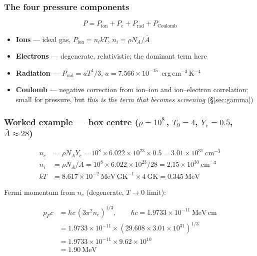\subsubsection{The four pressure components}
\label{sec:pressurecomponents}

\begin{equation*}
P = P_{\mathrm{ion}} + P_{e} + P_{\mathrm{rad}} + P_{\mathrm{Coulomb}}
\end{equation*}

\begin{itemize}
\item \textbf{Ions} --- ideal gas, $P_{\mathrm{ion}} = n_i kT$,
      $n_i = \rho N_A/\bar{A}$
\item \textbf{Electrons} --- degenerate, relativistic; the dominant term here
\item \textbf{Radiation} --- $P_{\mathrm{rad}} = aT^4/3$,
      $a = 7.566\times10^{-15}$~erg\,cm$^{-3}$\,K$^{-4}$
      \citep{codata2022}
\item \textbf{Coulomb} --- negative correction from ion--ion and ion--electron
      correlation; small for pressure, but \emph{this is the term that becomes
      screening} (\S\ref{sec:gamma})
\end{itemize}

\subsubsection{Worked example --- box centre
  (\texorpdfstring{$\rho = 10^{8}$\,\gcc, $T_9 = 4$, $Y_e = 0.5$,
   $\bar{A} \approx 28$}{rho = 1e8, T9 = 4, Ye = 0.5, Abar = 28})}
\label{sec:boxcentre}

\begin{align*}
n_e &= \rho N_A Y_e = 10^{8}\times 6.022\times10^{23}\times 0.5
       = 3.01\times10^{31}\ \mathrm{cm^{-3}}\\
n_i &= \rho N_A/\bar{A} = 10^{8}\times 6.022\times10^{23}/28
       = 2.15\times10^{30}\ \mathrm{cm^{-3}}\\
kT  &= 8.617\times10^{-2}\ \mathrm{MeV\,GK^{-1}}\times 4\ \mathrm{GK}
       = 0.345\ \mathrm{MeV}
\end{align*}

Fermi momentum from $n_e$ (degenerate, $T \to 0$ limit):

\begin{align*}
p_F c &= \hbar c\,(3\pi^2 n_e)^{1/3}, \qquad
         \hbar c = 1.9733\times10^{-11}\ \mathrm{MeV\,cm}\\
&= 1.9733\times10^{-11}\times(29.608\times 3.01\times10^{31})^{1/3}\\
&= 1.9733\times10^{-11}\times 9.62\times10^{10}\\
&= 1.90\ \mathrm{MeV}
\end{align*}

